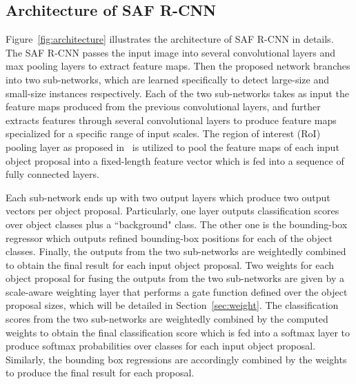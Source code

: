\documentclass[journal]{IEEEtran}
\begin{document}
\subsection{Architecture of SAF R-CNN}
Figure~\ref{fig:architecture} illustrates the architecture of SAF R-CNN in details. The SAF R-CNN passes the input image into several convolutional layers and max pooling layers to extract feature maps. Then the proposed network branches into two sub-networks, which are learned specifically to detect large-size and small-size instances respectively. Each of the two sub-networks takes as input the feature maps produced from the previous convolutional layers, and further extracts features through several convolutional layers to produce feature maps specialized for a specific range of input scales. The region of interest (RoI) pooling layer as proposed in~\cite{girshick2015fast} is utilized to pool the feature maps of each input object proposal into a fixed-length feature vector which is fed into a sequence of fully connected layers.

Each sub-network ends up with two output layers which produce two output vectors per object proposal. Particularly, one layer outputs classification scores over  object classes plus a ``background" class. The other one is the bounding-box regressor which outputs refined bounding-box positions for each of the  object classes. Finally, the outputs from the two sub-networks are weightedly combined to obtain the final result for each input object proposal. Two weights for each object proposal for fusing the outputs from the two sub-networks are given by a scale-aware weighting layer that performs a gate function defined over the object proposal sizes, which will be detailed in Section~\ref{sec:weight}. The classification scores from the two sub-networks are weightedly combined by the computed weights to obtain the final classification score which is fed into a softmax layer to produce softmax probabilities over  classes for each input object proposal. Similarly, the bounding box regressions are accordingly combined by the weights to produce the final result for each proposal.
\end{document}
